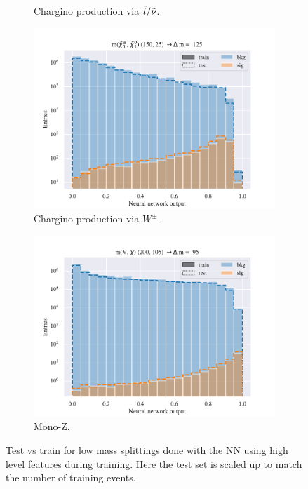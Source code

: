 \begin{figure}[H]
\begin{subfigure}[t!]{0.49\textwidth}
        \caption{Chargino production via $\Tilde{l}/\Tilde{\nu}$.}
        \label{fig:}
    \end{subfigure}    
    \begin{subfigure}[t!]{0.49\textwidth}
        \includegraphics[width = \textwidth]{Figures/WW/NN/High_level/Low/scaled_train_test_395268.pdf}
        \caption{Chargino production via $W^\pm$.}
        \label{fig:}
    \end{subfigure}
    \begin{subfigure}[t!]{0.49\textwidth}
        \includegraphics[width = \textwidth]{Figures/Mono_Z/ML/NN/High_level/Low/scaled_train_test_310604.pdf}
        \caption{Mono-Z.}
        \label{fig:}
    \end{subfigure}
    \caption{Test vs train for low mass splittings done with the NN using high level features during training. Here the test set is scaled up to match the number of training events.}
    \label{fig:}
\end{figure}





